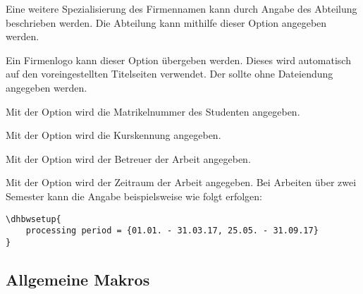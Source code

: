 \documentclass[babel=ngerman,highlight=false]{skdoc}
\begin{document}
            Eine weitere Spezialisierung des Firmennamen kann durch Angabe des Abteilung beschrieben werden. Die Abteilung kann mithilfe dieser Option angegeben werden.\medskip
            
            Ein Firmenlogo kann dieser Option übergeben werden. Dieses wird automatisch auf den voreingestellten Titelseiten verwendet. Der  sollte ohne Dateiendung angegeben werden.\medskip
            
            Mit der Option wird die Matrikelnummer des Studenten angegeben.\medskip
            
            Mit der Option wird die Kurskennung angegeben.\medskip
            
            Mit der Option wird der Betreuer der Arbeit angegeben.\medskip
            
            Mit der Option wird der Zeitraum der Arbeit angegeben. Bei Arbeiten über zwei Semester kann die Angabe beispielsweise wie folgt erfolgen:
            \begin{verbatim}
\dhbwsetup{
    processing period = {01.01. - 31.03.17, 25.05. - 31.09.17}
}
            \end{verbatim}
            
        \subsection{Allgemeine Makros}
            \DescribeMacro{}
            
            \DescribeMacro\dhbwtitlepage
            
            \DescribeMacro\dhbwdeclaration
            
            \DescribeMacro\getAuthor
            
            \DescribeMacro\getDate
            
            \DescribeMacro\getThesisTitle
            
            \DescribeMacro\getThesisSecondTitle
            
            \DescribeMacro\getLocation
            
\end{document}
